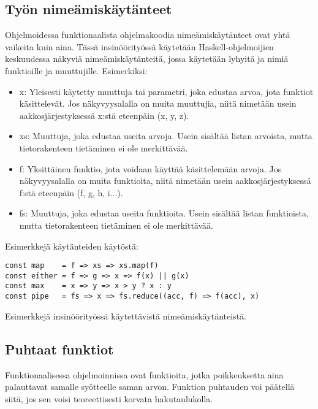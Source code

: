 \subsection{Työn nimeämiskäytänteet}

Ohjelmoidessa funktionaalista ohjelmakoodia nimeämiskäytänteet ovat yhtä vaikeita kuin aina. Tässä insinöörityössä käytetään Haskell-ohjelmoijien keskuudessa näkyviä nimeämiskäytänteitä, jossa käytetään lyhyitä ja  nimiä funktioille ja muuttujille. Esimerkiksi:

\begin{itemize}
    \item x: Yleisesti käytetty muuttuja tai parametri, joka edustaa arvoa, jota funktiot käsittelevät. Jos näkyvyysalalla on muita muuttujia, niitä nimetään usein aakkosjärjestyksessä x:stä eteenpäin (x, y, z).
    \item xs: Muuttuja, joka edustaa useita arvoja. Usein sisältää listan arvoista, mutta tietorakenteen tietäminen ei ole merkittävää.
    \item f: Yksittäinen funktio, jota voidaan käyttää käsittelemään arvoja. Jos näkyvyysalalla on muita funktioita, niitä nimetään usein aakkosjärjestyksessä f:stä eteenpäin (f, g, h, i...).
    \item fs: Muuttuja, joka edustaa useita funktioita. Usein sisältää listan funktioista, mutta tietorakenteen tietäminen ei ole merkittävää.
\end{itemize}

Esimerkkejä käytänteiden käytöstä:

\begin{code}
    \begin{verbatim}
const map    = f => xs => xs.map(f)
const either = f => g => x => f(x) || g(x)
const max    = x => y => x > y ? x : y
const pipe   = fs => x => fs.reduce((acc, f) => f(acc), x)
\end{verbatim}
    \caption{Esimerkkejä insinöörityössä käytettävistä nimeämiskäytänteistä.}
    \label{code:javascript_naming_convention_example}
\end{code}

\subsection{Puhtaat funktiot}

Funktionaalisessa ohjelmoinnissa  ovat funktioita, jotka poikkeuksetta aina palauttavat samalle syötteelle saman arvon. Funktion puhtauden voi päätellä siitä, jos sen voisi teoreettisesti korvata hakutaulukolla. \citep{feldman_fp_pragmatists}


